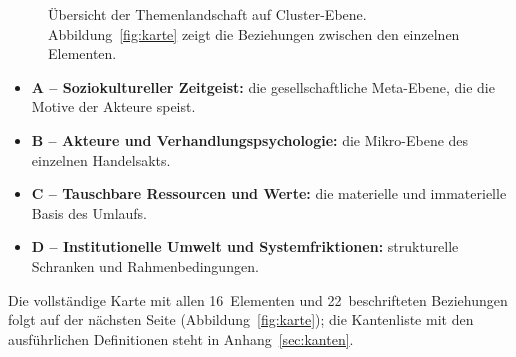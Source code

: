 \documentclass[11pt, a4paper]{article}
\begin{document}
\begin{figure}[H]
\caption[Übersicht der Themenlandschaft (Cluster-Ebene)]{Übersicht der
Themenlandschaft auf Cluster-Ebene. Abbildung~\ref{fig:karte} zeigt die
Beziehungen zwischen den einzelnen Elementen.}
\label{fig:uebersicht}
\end{figure}

\begin{itemize}
    \item \textbf{\color{clA}A -- Soziokultureller Zeitgeist:} die
          gesellschaftliche Meta-Ebene, die die Motive der Akteure speist.
    \item \textbf{\color{clB}B -- Akteure und Verhandlungspsychologie:} die
          Mikro-Ebene des einzelnen Handelsakts.
    \item \textbf{\color{clC}C -- Tauschbare Ressourcen und Werte:} die
          materielle und immaterielle Basis des Umlaufs.
    \item \textbf{\color{clD!90!black}D -- Institutionelle Umwelt und
          Systemfriktionen:} strukturelle Schranken und Rahmenbedingungen.
\end{itemize}
Die vollständige Karte mit allen 16~Elementen und 22~beschrifteten Beziehungen
folgt auf der nächsten Seite (Abbildung~\ref{fig:karte}); die
Kantenliste mit den ausführlichen Definitionen steht in
Anhang~\ref{sec:kanten}.
\end{document}

